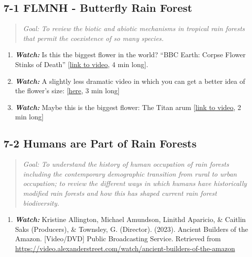 \documentclass[
  10pt,
  letterpaper,
  oneside,
  open=any]{scrbook}
\providecommand{\tightlist}{%
  \setlength{\itemsep}{0pt}\setlength{\parskip}{0pt}}\usepackage{longtable,booktabs,array}
\begin{document}
\subsection*{7-1 FLMNH - Butterfly Rain
Forest}\label{flmnh---butterfly-rain-forest}

\begin{quote}
\emph{Goal: To review the biotic and abiotic mechanisms in tropical rain
forests that permit the coexistence of so many species.}
\end{quote}

\begin{enumerate}
\def\labelenumi{\arabic{enumi}.}
\item
  \textbf{\emph{Watch:}} Is this the biggest flower in the world? ``BBC
  Earth: Corpse Flower Stinks of Death''
  {[}\href{https://www.youtube.com/watch?v=YxIpl38rsMo}{link to video},
  4 min long{]}.
\item
  \textbf{\emph{Watch:}} A slightly less dramatic video in which you can
  get a better idea of the flower's size:
  {[}\href{https://www.youtube.com/watch?v=0cGRujABwuQ}{here}, 3 min
  long{]}
\item
  \textbf{\emph{Watch:}} Maybe this is the biggest flower: The Titan
  arum {[}\href{https://www.youtube.com/watch?v=5Jg-GlCXpEI}{link to
  video}, 2 min long{]}
\end{enumerate}

\subsection*{7-2 Humans are Part of Rain
Forests}\label{humans-are-part-of-rain-forests}

\begin{quote}
\emph{Goal: To understand the history of human occupation of rain
forests including the contemporary demographic transition from rural to
urban occupation; to review the different ways in which humans have
historically modified rain forests and how this has shaped current rain
forest biodiversity.}
\end{quote}

\begin{enumerate}
\def\labelenumi{\arabic{enumi}.}
\tightlist
\item
  \textbf{\emph{Watch:}} Kristine Allington, Michael Amundson, Linithd
  Aparicio, \& Caitlin Saks (Producers), \& Townsley, G. (Director).
  (2023). Ancient Builders of the Amazon. {[}Video/DVD{]} Public
  Broadcasting Service. Retrieved from
  \url{https://video.alexanderstreet.com/watch/ancient-builders-of-the-amazon}
\end{enumerate}
\end{document}
